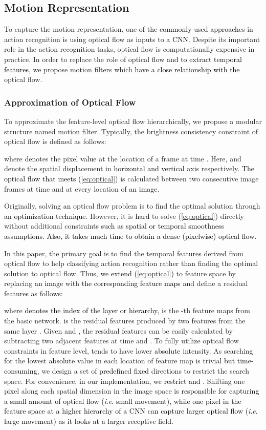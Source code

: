 \documentclass[runningheads]{llncs}
\newcommand{\ie}{\textit{i}.\textit{e}. }
\newcommand{\nj}[1]{\textcolor{black}{#1}}
\newcommand{\mg}[1]{\textcolor{black}{#1}}
\begin{document}
\subsection{Motion Representation}
To capture the motion representation, one \nj{of the commonly used approaches} in action recognition is using optical flow as inputs to \nj{a CNN}. Despite its important role in the action recognition tasks, optical flow is computationally expensive in practice. In order to replace the role of optical flow \nj{and to extract temporal features}, we propose motion filters which \nj{have a close relationship with the} optical flow.

\subsubsection{Approximation of Optical Flow}
To approximate the feature-level optical flow hierarchically, we propose a modular structure named motion filter. Typically, the brightness consistency constraint of optical flow is defined as follows:

where  denotes the pixel \nj{value} at the location  of a frame at time . 
Here,  and  denote the spatial displacement in \nj{horizontal and vertical} axis respectively. 
\nj{The optical flow  that meets (\ref{eq:optical})} 
is calculated between two consecutive image frames at time  and  at every location of \nj{an image}. 

Originally, solving \nj{an} optical flow problem is to find the optimal solution  through \nj{an optimization technique}. However, it is \nj{hard} to solve (\ref{eq:optical}) directly without additional constraints \nj{such as spatial or temporal smoothness assumptions. Also, it takes much time to obtain a dense (pixelwise) optical flow.} 

In this paper, the primary goal is to find the temporal features derived from optical flow to help classifying action recognition rather than finding the optimal solution to optical flow. Thus, we \nj{extend (\ref{eq:optical})} to feature space by replacing \nj{an image}  with \nj{the corresponding feature maps}  and define a residual features  as follows:

where  \nj{denotes the index of the layer or hierarchy},  is the \nj{-th} feature maps from the basic network.
 is the residual features produced by two features from the same layer . Given  and , the residual features  can be easily calculated by subtracting two adjacent features at time  and . To fully utilize optical flow constraints in feature level,  tends to have lower \nj{absolute} intensity. As searching for the lowest \nj{absolute} value in each location of feature map is trivial \nj{but time-consuming}, we design a set of \nj{predefined fixed} directions \nj{} to restrict the search space. For convenience, \nj{in our implementation,} \mg{we \nj{restrict}  and .} Shifting one pixel along each spatial dimension in \nj{the} image space 
\nj{is responsible for capturing a small amount of optical flow (\ie small movement), 
while one pixel in the feature space at a higher hierarchy of a CNN can capture larger optical flow (\ie large movement) as it looks at a larger receptive field.}
\end{document}
